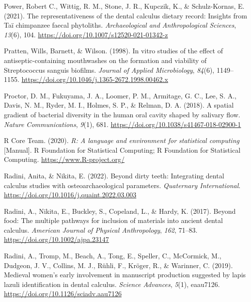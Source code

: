 \documentclass[
  letterpaper,
]{book}
\newlength{\cslhangindent}
\newlength{\cslentryspacingunit} %
\newenvironment{CSLReferences}[2] %
 {%
  \setlength{\parindent}{0pt}
  \ifodd #1
  \let\oldpar\par
  \def\par{\hangindent=\cslhangindent\oldpar}
  \fi
  \setlength{\parskip}{#2\cslentryspacingunit}
 }%
 {}
\begin{document}
\begin{CSLReferences}{1}{0}
\leavevmode{}%
Power, Robert C., Wittig, R. M., Stone, J. R., Kupczik, K., \&
Schulz-Kornas, E. (2021). The representativeness of the dental calculus
dietary record: Insights from {Taï} chimpanzee faecal phytoliths.
\emph{Archaeological and Anthropological Sciences}, \emph{13}(6), 104.
\url{https://doi.org/10.1007/s12520-021-01342-z}

\leavevmode{}%
Pratten, Wills, Barnett, \& Wilson. (1998). In vitro studies of the
effect of antiseptic-containing mouthwashes on the formation and
viability of {Streptococcus} sanguis biofilms. \emph{Journal of Applied
Microbiology}, \emph{84}(6), 1149--1155.
\url{https://doi.org/10.1046/j.1365-2672.1998.00462.x}

\leavevmode{}%
Proctor, D. M., Fukuyama, J. A., Loomer, P. M., Armitage, G. C., Lee, S.
A., Davis, N. M., Ryder, M. I., Holmes, S. P., \& Relman, D. A. (2018).
A spatial gradient of bacterial diversity in the human oral cavity
shaped by salivary flow. \emph{Nature Communications}, \emph{9}(1), 681.
\url{https://doi.org/10.1038/s41467-018-02900-1}

\leavevmode{}%
R Core Team. (2020). \emph{R: {A} language and environment for
statistical computing} {[}Manual{]}. {R Foundation for Statistical
Computing}; {R Foundation for Statistical Computing}.
\url{https://www.R-project.org/}

\leavevmode{}%
Radini, Anita, \& Nikita, E. (2022). Beyond dirty teeth: {Integrating}
dental calculus studies with osteoarchaeological parameters.
\emph{Quaternary International}.
\url{https://doi.org/10.1016/j.quaint.2022.03.003}

\leavevmode{}%
Radini, A., Nikita, E., Buckley, S., Copeland, L., \& Hardy, K. (2017).
Beyond food: {The} multiple pathways for inclusion of materials into
ancient dental calculus. \emph{American Journal of Physical
Anthropology}, \emph{162}, 71--83.
\url{https://doi.org/10.1002/ajpa.23147}

\leavevmode{}%
Radini, A., Tromp, M., Beach, A., Tong, E., Speller, C., McCormick, M.,
Dudgeon, J. V., Collins, M. J., Rühli, F., Kröger, R., \& Warinner, C.
(2019). Medieval women's early involvement in manuscript production
suggested by lapis lazuli identification in dental calculus.
\emph{Science Advances}, \emph{5}(1), eaau7126.
\url{https://doi.org/10.1126/sciadv.aau7126}


\end{CSLReferences}
\end{document}
